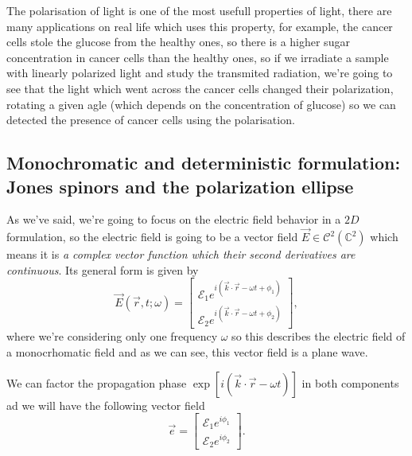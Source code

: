     The polarisation of light is one of the most usefull properties of light, there are many applications on real life which uses this property, for example, the cancer cells stole the glucose from the healthy ones, so there is a higher sugar concentration in cancer cells than the healthy ones, so if we irradiate a sample with linearly polarized light and study the transmited radiation, we're going to see that the light which went across the cancer cells changed their polarization, rotating a given agle (which depends on the concentration of glucose)  so we can detected the presence of cancer cells using the polarisation.


    \subsection{Monochromatic and deterministic formulation: Jones spinors and the polarization ellipse}

        As we've said, we're going to focus on the electric field behavior in a $2D$ formulation, so the electric field is going to be a vector field $\vec{E} \in \mathcal{C}^2\left(\mathbb{C}^2\right)$ which means it is \textit{a complex vector function which their second derivatives are continuous}. Its general form is given by
        \begin{equation}
            \vec{E}(\vec{r},t; \omega) =
            \begin{bmatrix}
                \mathcal{E}_1 e^{i\left(\vec{k}\cdot\vec{r} - \omega t + \phi_1\right)}\\
                \mathcal{E}_2 e^{i\left(\vec{k}\cdot\vec{r} - \omega t + \phi_2\right)}
            \end{bmatrix},
        \end{equation}
        where we're considering only one frequency $\omega$ so this describes the electric field of a monocrhomatic field and as we can see, this vector field is a plane wave. 

        We can factor the propagation phase $\exp\left[i \left(\vec{k}\cdot\vec{r} - \omega t\right)\right]$ in both components ad we will have the following vector field
        \begin{equation}\label{eq:JonesVec}
            \vec{e} =
            \begin{bmatrix}
                \mathcal{E}_1e^{i\phi_1}\\
                \mathcal{E}_2e^{i\phi_2}
            \end{bmatrix}.
        \end{equation}

